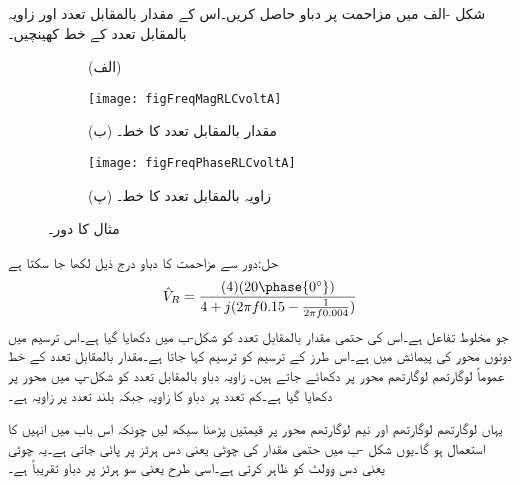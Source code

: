 شکل -الف میں مزاحمت پر دباو حاصل کریں۔اس کے مقدار بالمقابل تعدد اور زاویہ بالمقابل تعدد کے خط کھینچیں۔
\begin{figure}
\centering
\begin{subfigure}{1\textwidth}
\centering
{}
\caption*{(الف)}
\end{subfigure}
\begin{subfigure}{1\textwidth}
\centering
\texttt{[image: figFreqMagRLCvoltA]}
\caption*{(ب) مقدار بالمقابل تعدد کا خط۔}
\end{subfigure}
\begin{subfigure}{1\textwidth}
\centering
\texttt{[image: figFreqPhaseRLCvoltA]}
\caption*{(پ) زاویہ بالمقابل تعدد کا خط۔}
\end{subfigure}
\caption{مثال  کا دور۔}
\label{شکل_تعددی_بوڈا_خط_مزاحمت_امالہ_برق_گیر_رو_الف}
\end{figure}

حل:دور سے مزاحمت کا دباو درج ذیل لکھا جا سکتا ہے
\begin{align*}
\hat{V}_R=\frac{(4)(20\phase{0^{\circ}})}{4+j(2\pi f 0.15-\frac{1}{2\pi f 0.004})}
\end{align*}
جو مخلوط تفاعل ہے۔اس کی حتمی مقدار  بالمقابل تعدد  کو شکل-ب میں دکھایا گیا ہے۔اس ترسیم میں دونوں محور کی پیمائش  میں ہے۔اس طرز کے ترسیم کو  ترسیم کہا جاتا  ہے۔مقدار بالمقابل تعدد کے خط عموماً لوگارتھم لوگارتھم محور پر دکھائے جاتے ہیں۔ زاویہ دباو  بالمقابل تعدد کو شکل-پ میں  محور پر دکھایا گیا ہے۔کم تعدد پر دباو کا زاویہ  جبکہ بلند تعدد پر زاویہ  ہے۔

یہاں لوگارتھم لوگارتھم اور نیم لوگارتھم محور پر قیمتیں پڑھنا سیکھ لیں چونکہ اس باب میں انہیں کا استعمال ہو گا۔یوں شکل -ب میں  حتمی مقدار کی چوٹی  یعنی دس ہرٹز پر پائی جاتی ہے۔یہ چوٹی  یعنی دس وولٹ کو ظاہر کرتی ہے۔اسی طرح  یعنی سو ہرٹز پر دباو تقریباً   ہے۔

